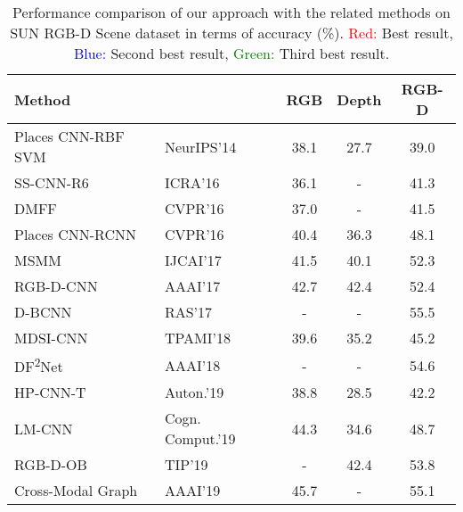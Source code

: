 \begin{table}[!t]
	\caption{Performance comparison of our approach with the related methods on SUN RGB-D Scene dataset in terms of accuracy (\%). \textcolor{red}{Red:} Best result, \textcolor{blue}{Blue:} Second best result, \textcolor{green}{Green:} Third best result.}
	\begin{center}
		\setlength{\tabcolsep}{0.9em} %
		\def\arraystretch{1.2}
		\begin{adjustbox}{width=\columnwidth}
			\begin{tabular}{ llccc }
				\hline
				Method 												&					& RGB 				& Depth 			& RGB-D \\ \hline \hline
				Places CNN-RBF SVM \citep{2014_NIPS_Zhou}    		& NeurIPS'14 		& 38.1 				& 27.7 	 			& 39.0 		\\
				SS-CNN-R6 \citep{2016_ICRA_Liao}    				& ICRA'16			& 36.1 				& - 	 			& 41.3 		\\ 
				DMFF \citep{2016_CVPR_Zhu}    						& CVPR'16			& 37.0  			& - 				& 41.5 		\\ 
				Places CNN-RCNN \citep{2016_CVPR_Wang}         		& CVPR'16			& 40.4 	           	& 36.3 	        	& 48.1 		\\ 
				MSMM \citep{2017_IJCAI_Song}         				& IJCAI'17			& 41.5 	           	& 40.1 	        	& 52.3 		\\ 
				RGB-D-CNN \citep{2017_AAAI_Song}         			& AAAI'17			& 42.7 	           	& 42.4 	        	& 52.4 		\\ 
				D-BCNN \citep{2017_RAS_Zaki}         				& RAS'17			& - 	           	& - 	        	& 55.5 		\\ 
				MDSI-CNN \citep{2018_TPAMI_Asif}         			& TPAMI'18			& 39.6 	           	& 35.2 	        	& 45.2 		\\ 
				DF\textsuperscript{2}Net \citep{2018_AAAI_Li} 		& AAAI'18			& - 	           	& - 	        	& 54.6 		\\ 
				HP-CNN-T \citep{2019_AuotRob_Zaki}         			& Auton.'19			& 38.8 	           	& 28.5 	        	& 42.2 		\\ 
				LM-CNN \citep{2019_CogComp_Cai}         			& Cogn. Comput.'19	& 44.3 	           	& 34.6 	        	& 48.7 		\\ 
				RGB-D-OB \citep{2019_TIP_Song}         				& TIP'19			& - 	           	& 42.4 	        	& 53.8 		\\ 
				Cross-Modal Graph \citep{2019_AAAI_Yuan}        	& AAAI'19			& 45.7 	           	& - 	        	& 55.1		\\

\end{tabular}
\end{adjustbox}
\end{center}
\end{table}
